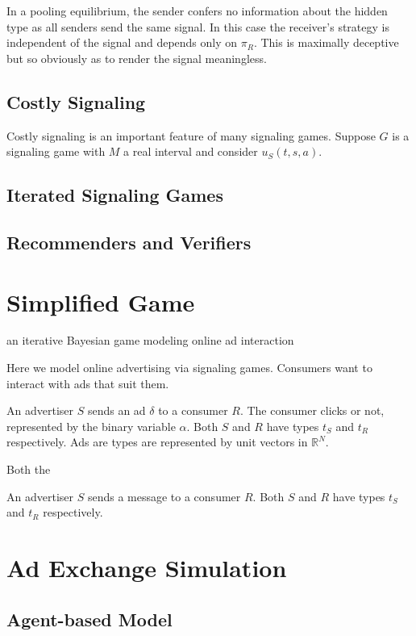 \documentclass{article}
\begin{document}
In a pooling equilibrium, the sender confers no information about the hidden type as all senders send the same signal. In this case the receiver's strategy is independent of the signal and depends only on $\pi_{ R}$. This is maximally deceptive but so obviously as to render the signal meaningless.

\subsection{Costly Signaling}

Costly signaling is an important feature of many signaling games. Suppose $G$ is a signaling game with $M$ a real interval and consider $u_{S}(t,s,a)$.

\subsection{Iterated Signaling Games}

\subsection{Recommenders and Verifiers}

\newpage

\section{Simplified Game}

an iterative Bayesian game modeling online ad interaction

Here we model online advertising via signaling games.  Consumers want to interact with ads that suit them.

An advertiser $S$ sends an ad $\delta$ to a consumer $R$. The consumer clicks or not, represented by the binary variable $\alpha$. Both $S$ and $R$ have types $t_S$ and $t_R$ respectively. Ads are types are represented by unit vectors in $\mathbb{R}^N$.

Both the 



An advertiser $S$ sends a message to a consumer $R$. Both $S$ and $R$ have types $t_S$ and $t_R$ respectively. 

\section{Ad Exchange Simulation}

\subsection{Agent-based Model}
\end{document}
